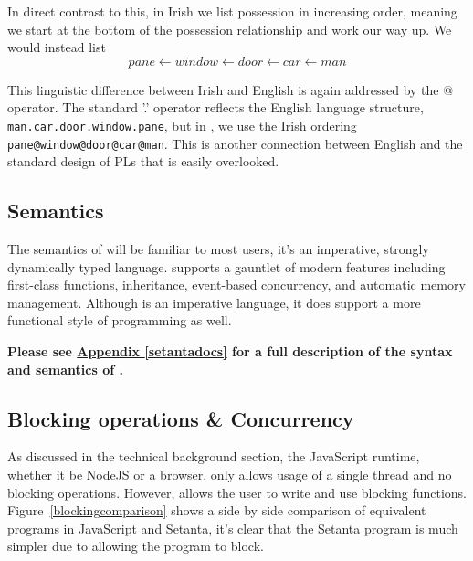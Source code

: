 In direct contrast to this, in Irish we list possession in increasing order, meaning we start at the bottom of the possession relationship and work our way up. We would instead list
\[pane \leftarrow window \leftarrow door \leftarrow car \leftarrow man\]

This linguistic difference between Irish and English is again addressed by the @ operator. The standard '.' operator reflects the English language structure, \verb|man.car.door.window.pane|, but in \Setanta{}, we use the Irish ordering \verb|pane@window@door@car@man|. This is another connection between English and the standard design of PLs that is easily overlooked.

\subsection{Semantics}

The semantics of \Setanta{} will be familiar to most users, it's an imperative, strongly dynamically typed language. \Setanta{} supports a gauntlet of modern features including first-class functions, inheritance, event-based concurrency, and automatic memory management. Although \Setanta{} is an imperative language, it does support a more functional style of programming as well.

        \noindent\textbf{Please see \hyperref[setantadocs]{Appendix \ref*{setantadocs}} for a full description of the syntax and semantics of \Setanta{}.}

\subsection{Blocking operations \& Concurrency}

As discussed in the technical background section, the JavaScript runtime, whether it be NodeJS or a browser, only allows usage of a single thread and no blocking operations.
However, \Setanta{} allows the user to write and use blocking functions. Figure~\ref{blockingcomparison} shows a side by side comparison of equivalent programs in JavaScript and Setanta, it's clear that the Setanta program is much simpler due to allowing the program to block.

